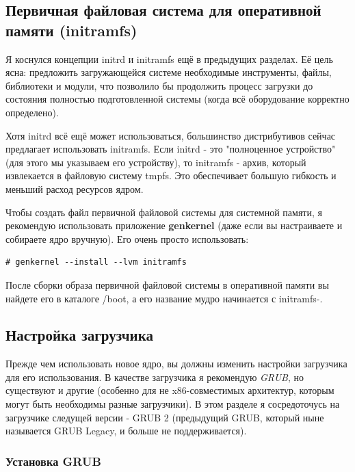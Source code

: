 \documentclass[10pt]{book}
\begin{document}
\subsection{Первичная файловая система для оперативной памяти (initramfs)}

Я коснулся концепции initrd и initramfs ещё в предыдущих разделах. Её цель ясна: предложить загружающейся системе необходимые инструменты, файлы, библиотеки и модули, что позволило бы продолжить процесс загрузки до состояния полностью подготовленной системы (когда всё оборудование корректно определено).

Хотя initrd всё ещё может использоваться, большинство дистрибутивов сейчас предлагает использовать initramfs. Если initrd - это "полноценное устройство" (для этого мы указываем его устройству), то initramfs - архив, который извлекается в файловую систему tmpfs. Это обеспечивает большую гибкость и меньший расход ресурсов ядром.

Чтобы создать файл первичной файловой системы для системной памяти, я рекомендую использовать приложение \textbf{genkernel} (даже если вы настраиваете и собираете ядро вручную). Его очень просто использовать:

\vspace{3mm}
\begin{tcolorbox}
\begin{lstlisting}
# genkernel --install --lvm initramfs
\end{lstlisting}
\end{tcolorbox}

После сборки образа первичной файловой системы в оперативной памяти вы найдете его в каталоге /boot, а его название мудро начинается с  initramfs-.

\subsection{Настройка загрузчика}

Прежде чем использовать новое ядро, вы должны изменить настройки загрузчика для его использования. В качестве загрузчика я рекомендую \textit{GRUB}, но существуют и другие (особенно для не x86-совместимых архитектур, которым могут быть необходимы разные загрузчики). В этом разделе я сосредоточусь на загрузчике следущей версии - GRUB 2  (предыдущий GRUB, который ныне называется GRUB Legacy, и больше не поддерживается).

\subsubsection{Установка GRUB}
\end{document}

